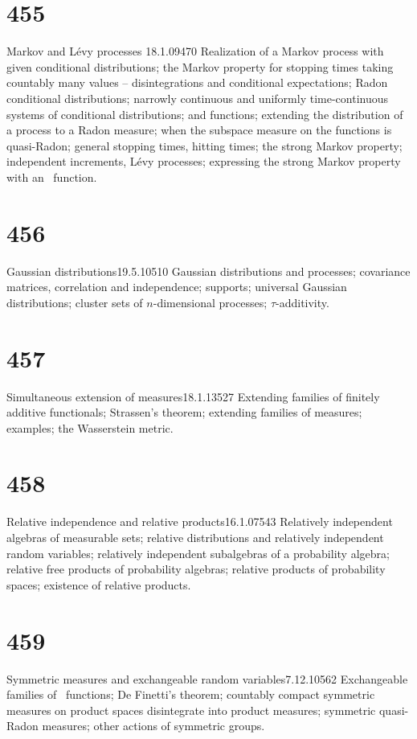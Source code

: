 \section{455}{Markov and L\'evy processes}
{18.1.09}{470}{}
{Realization of a Markov process with given
conditional distributions;  the Markov property for stopping times taking
countably many values -- disintegrations and conditional expectations;
Radon conditional distributions;  narrowly continuous and uniformly
time-continuous systems of conditional distributions;  \cadlag{}
and \callal{} functions;  extending the distribution of a process to a
Radon measure;  when the subspace
measure on the \cadlag{} functions is quasi-Radon;
general stopping times, hitting times;  the strong Markov property;
independent
increments, L\'evy processes;  expressing the strong Markov property 
with an \imp\ function.}

\section{456}{Gaussian distributions}{19.5.10}{510}{}
{Gaussian distributions and processes;  covariance matrices, correlation
and independence;  supports;  universal Gaussian distributions;
cluster sets of $n$-dimensional processes;  $\tau$-additivity.}

\section{457}{Simultaneous extension of measures}{18.1.13}{527}{}
{Extending families of finitely additive functionals;  Strassen's
theorem;  extending families of measures;  examples;  the Wasserstein
metric.}

\section{458}{Relative independence and relative
products}{16.1.07}{543}{}
{Relatively independent algebras of measurable sets;
relative distributions and relatively independent random variables;
relatively independent
subalgebras of a probability algebra;  relative free products of
probability algebras;  relative products of probability spaces;
existence of relative products.}

\section{459}{Symmetric measures and exchangeable random
variables}{7.12.10}{562}{}
{Exchangeable families of \imp\ functions;
De Finetti's theorem;  countably compact symmetric measures on product
spaces disintegrate into product measures;  symmetric quasi-Radon
measures;  other actions of symmetric groups.}



